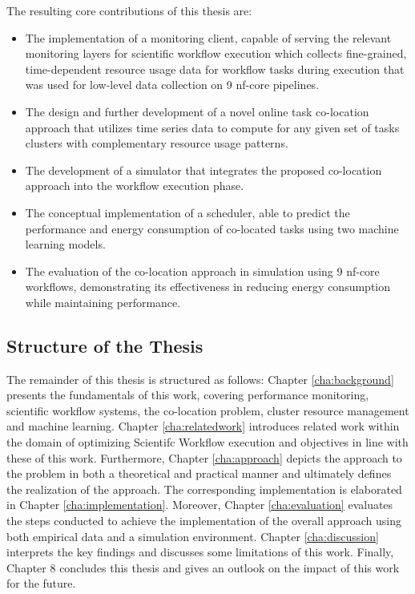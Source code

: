 The resulting core contributions of this thesis are:
\begin{itemize}
    \item The implementation of a monitoring client, capable of serving the relevant monitoring layers for scientific workflow execution which collects fine-grained, time-dependent resource usage data for workflow tasks during execution that was used for low-level data collection on 9 nf-core pipelines.
    \item The design and further development of a novel online task co-location approach that utilizes time series data to compute for any given set of tasks clusters with complementary resource usage patterns.
    \item The development of a simulator that integrates the proposed co-location approach into the workflow execution phase.
    \item The conceptual implementation of a scheduler, able to predict the performance and energy consumption of co-located tasks using two machine learning models.
    \item The evaluation of the co-location approach in simulation using 9 nf-core workflows, demonstrating its effectiveness in reducing energy consumption while maintaining performance.
\end{itemize}
\subsection{Structure of the Thesis}
\label{subse:structure_of_the_thesis}
The remainder of this thesis is structured as follows: Chapter \ref{cha:background} presents the fundamentals of this work, covering performance monitoring, scientific workflow systems, the co-location problem, cluster resource management and machine learning. Chapter \ref{cha:relatedwork} introduces related work within the domain of optimizing Scientifc Workflow execution and objectives in line with these of this work. Furthermore, Chapter \ref{cha:approach} depicts the approach to the problem in both a theoretical and practical manner and ultimately defines the realization of the approach. The corresponding implementation is elaborated in Chapter \ref{cha:implementation}. Moreover, Chapter \ref{cha:evaluation} evaluates the steps conducted to achieve the implementation of the overall approach using both empirical data and a simulation environment. Chapter \ref{cha:discussion} interprets the key findings and discusses some limitations of this work. Finally, Chapter 8 concludes this thesis and gives an outlook on the impact of this work for the future.
